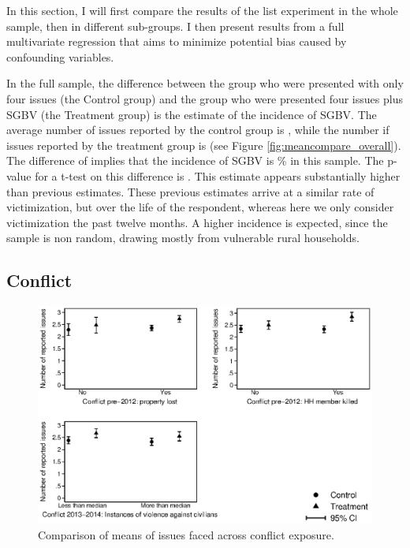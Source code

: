 In this section, I will first compare the results of the list experiment in the whole sample, then in different sub-groups. I then present results from a full multivariate regression that aims to minimize potential bias caused by confounding variables. 

In the full sample, the difference between the group who were presented with only four issues (the Control group) and the group who were presented four issues plus SGBV (the Treatment group) is the estimate of the incidence of SGBV. The average number of issues reported by the control group is , while the number if issues reported by the treatment group is  (see Figure \ref{fig:meancompare_overall}). The difference of  implies that the incidence of SGBV is \% in this sample. The p-value for a t-test on this difference is . This estimate appears substantially higher than previous estimates. These previous estimates \citep[e.g.][]{Peterson2018,Stark2017,Johnson2010} arrive at a similar rate of victimization, but over the life of the respondent, whereas here we only consider victimization the past twelve months. A higher incidence is expected, since the sample is non random, drawing mostly from vulnerable rural households. 

\subsection{Conflict} 

\begin{figure}[htb]
  \includegraphics[width=\linewidth]{chapters/congogbv/figures/meancompare_conf.eps}
  \caption{Comparison of means of issues faced across conflict exposure.}
  \label{fig:meancompare_conf}
\end{figure}

